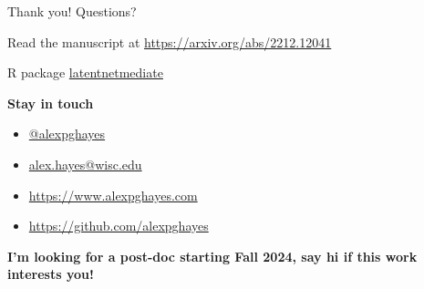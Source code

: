 \documentclass[aspectratio=169]{beamer}
\theoremstyle{remark}
\begin{document}
\begin{frame}{Thank you! Questions?}

    Read the manuscript at \url{https://arxiv.org/abs/2212.12041}

    R package \href{https://github.com/alexpghayes/latentnetmediate}{latentnetmediate}

    \textbf{Stay in touch}

    \begin{itemize}
        \item[]  \href{https://twitter.com/alexpghayes}{@alexpghayes}
        \item[]  \href{mailto:alex.hayes@wisc.edu}{alex.hayes@wisc.edu}
        \item[]  \url{https://www.alexpghayes.com} %
        \item[]  \url{https://github.com/alexpghayes}
    \end{itemize}

    \textbf{I'm looking for a post-doc starting Fall 2024, say hi if this work interests you!}
\end{frame}

\appendix









\end{document}
